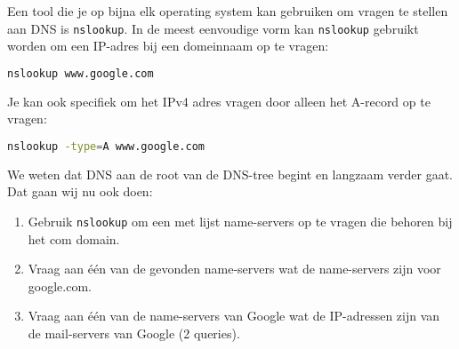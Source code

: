 Een tool die je op bijna elk operating system kan gebruiken om vragen te stellen aan DNS is \texttt{nslookup}. In de meest eenvoudige vorm kan \texttt{nslookup} gebruikt worden om een IP-adres bij een domeinnaam op te vragen:
\begin{lstlisting}[language=bash]
nslookup www.google.com
\end{lstlisting}

Je kan ook specifiek om het IPv4 adres vragen door alleen het A-record op te vragen:
\begin{lstlisting}[language=bash]
nslookup -type=A www.google.com
\end{lstlisting}

We weten dat DNS aan de root van de DNS-tree begint en langzaam verder gaat. Dat gaan wij nu ook doen:
\begin{enumerate}
\item Gebruik \texttt{nslookup} om een met lijst name-servers op te vragen die behoren bij het com domain.
\item Vraag aan \'e\'en van de gevonden name-servers wat de name-servers zijn voor google.com.
\item Vraag aan \'e\'en van de name-servers van Google wat de IP-adressen zijn van de mail-servers van Google (2 queries).
\end{enumerate}
